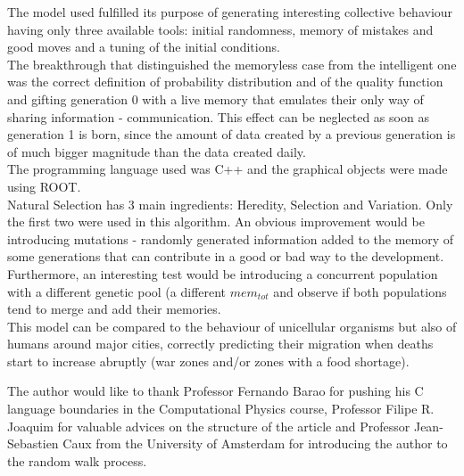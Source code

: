 \documentclass[a4paper,prd,twocolumn,nofootinbib,superscriptaddress,floatfix]{revtex4}
\begin{document}
The model used fulfilled its purpose of generating interesting collective behaviour having only three available tools: initial randomness, memory of mistakes and good moves and a tuning of the initial conditions.\\
The breakthrough that distinguished the memoryless case from the intelligent one  was the correct definition of probability distribution and of the quality function and gifting generation 0 with a live memory that emulates their only way of sharing information - communication. This effect can be neglected as soon as generation 1 is born, since the amount of data created by a previous generation is of much bigger magnitude than the data created daily.\\
The programming language used was C++ and the graphical objects were made using ROOT.\\
Natural Selection has 3 main ingredients: Heredity, Selection and Variation. Only the first two were used in this algorithm. An obvious improvement would be introducing mutations - randomly generated information added to the memory of some generations that can contribute in a good or bad way to the development.\\
Furthermore, an interesting test would be introducing a concurrent population with a different genetic pool (a different $mem_{tot}$ and observe if both populations tend to merge and add their memories.\\
This model can be compared to the behaviour of unicellular organisms but also of humans around major cities, correctly predicting their migration when deaths start to increase abruptly (war zones and/or zones with a food shortage).
\vspace{-6mm}
\acknowledgements

The author would like to thank Professor Fernando Barao for pushing his C language boundaries in the Computational Physics course, Professor Filipe R. Joaquim for valuable advices on the structure of the article and Professor Jean-Sebastien Caux from the University of Amsterdam for introducing the author to the random walk process.
\end{document}
